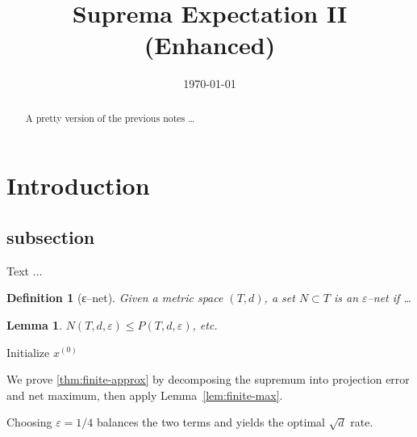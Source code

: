 \documentclass{article}
\title{Suprema Expectation II (Enhanced)}
\author{}
\date{\today}
\newtheorem{lemma}[theorem]{Lemma}
\newtheorem{definition}[theorem]{Definition}
\begin{document}
\maketitle

\begin{abstract}
A pretty version of the previous notes …
\end{abstract}

\section{Introduction}
\subsection{subsection}
Text $\ldots$

\begin{definition}[ε–net]
Given a metric space $(T,d)$, a set $N\subset T$ is an $\varepsilon$–net if …
\end{definition}

\begin{lemma}
$N(T,d,\varepsilon)\le P(T,d,\varepsilon)$, etc.
\end{lemma}
\begin{algorithm}[H]
Initialize $x^{(0)}$\;
\caption{Gradient Descent}\label{alg:gd}
\end{algorithm}

\begin{analysisBox}
We prove \cref{thm:finite-approx} by decomposing the supremum into
projection error and net maximum, then apply Lemma~\ref{lem:finite-max}.
\end{analysisBox}

\begin{remarkBox}
Choosing $\varepsilon = 1/4$ balances the two terms and yields the
optimal $\sqrt{d}$ rate.
\end{remarkBox}

\end{document}
